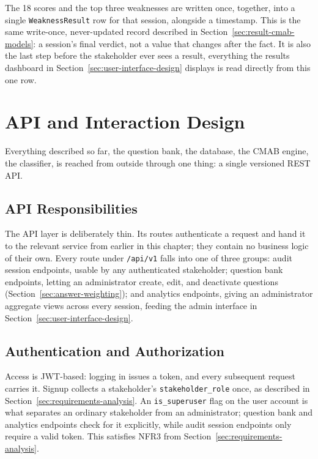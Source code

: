 \documentclass[a4paper, 12pt, oneside, openany, BCOR1cm,toc=chapterentrywithdots]{scrbook}
\begin{document}
The 18 scores and the top three weaknesses are written once, together, into a single
\texttt{WeaknessResult} row for that session, alongside a timestamp. This is the same
write-once, never-updated record described in Section~\ref{sec:result-cmab-models}: a session's
final verdict, not a value that changes after the fact. It is also the last step before the
stakeholder ever sees a result, everything the results dashboard in
Section~\ref{sec:user-interface-design} displays is read directly from this one row.
\section{API and Interaction Design}
\label{sec:api-design}

Everything described so far, the question bank, the database, the CMAB engine, the classifier,
is reached from outside through one thing: a single versioned REST API.

\subsection{API Responsibilities}

The API layer is deliberately thin. Its routes authenticate a request and hand it to the
relevant service from earlier in this chapter; they contain no business logic of their own.
Every route under \texttt{/api/v1} falls into one of three groups: audit session endpoints,
usable by any authenticated stakeholder; question bank endpoints, letting an administrator
create, edit, and deactivate questions (Section~\ref{sec:answer-weighting}); and analytics
endpoints, giving an administrator aggregate views across every session, feeding the admin
interface in Section~\ref{sec:user-interface-design}.

\subsection{Authentication and Authorization}

Access is JWT-based: logging in issues a token, and every subsequent request carries it.
Signup collects a stakeholder's \texttt{stakeholder\_role} once, as described in
Section~\ref{sec:requirements-analysis}. An \texttt{is\_superuser} flag on the user account is
what separates an ordinary stakeholder from an administrator; question bank and analytics
endpoints check for it explicitly, while audit session endpoints only require a valid token.
This satisfies NFR3 from Section~\ref{sec:requirements-analysis}.
\end{document}
